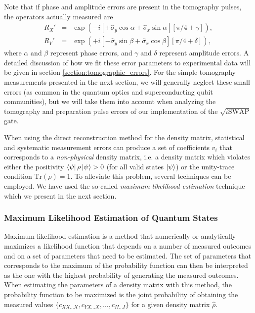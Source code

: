 %
Note that if phase and amplitude errors are present in the tomography pulses, the operators actually measured are
%
\begin{eqnarray}
R_{X}' & = & \exp{\left( -i \left[+\hat{\sigma}_y\cos{\alpha}+\hat{\sigma}_x\sin{\alpha} \right] \left[\pi / 4+\gamma\right]\right)}, \\
R_{Y}' & = & \exp{\left( +i \left[-\hat{\sigma}_y\sin{\beta}+\hat{\sigma}_x\cos{\beta}\right] \left[\pi / 4+\delta\right]\right)},
\end{eqnarray}
%
where $\alpha$ and $\beta$ represent phase errors, and $\gamma$ and $\delta$ represent amplitude errors. A detailed discussion of how we fit these error parameters to experimental data will be given in section \ref{section:tomographic_errors}. For the simple tomography measurements presented in the next section, we will generally neglect these small errors (as common in the quantum optics and superconducting qubit communities), but we will take them into account when analyzing the tomography and preparation pulse errors of our implementation of the $\sqrt{i\mathrm{SWAP}}$ gate.

When using the direct reconstruction method for the density matrix, statistical and systematic measurement errors can produce a set of coefficients $v_i$ that corresponds to a {\it non-physical} density matrix, i.e. a density matrix which violates either the positivity $\left< \psi \right|\rho\left| \psi \right> > 0$ (for all valid states $\left| \psi \right>$) or the unity-trace condition $\mathrm{Tr}(\rho)=1$. To alleviate this problem, several techniques can be employed. We have used the so-called {\it maximum likelihood estimation} technique which we present in the next section.

\subsubsection{Maximum Likelihood Estimation of Quantum States}

Maximum likelihood estimation is a method that numerically or analytically maximizes a likelihood function that depends on a number of measured outcomes and on a set of parameters that need to be estimated. The set of parameters that corresponds to the maximum of the probability function can then be interpreted as the one with the highest probability of generating the measured outcomes. When estimating the parameters of a density matrix with this method, the probability function to be maximized is the joint probability of obtaining the measured values $\{c_{XX\hdots X},c_{YX\hdots X},\hdots,c_{II\hdots I}\}$ for a given density matrix $\hat{\rho}$. 

